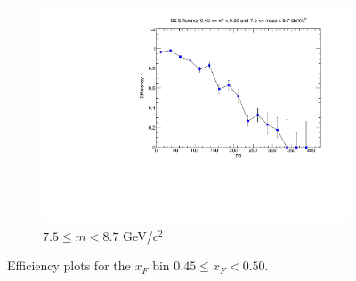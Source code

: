 \documentclass[11pt]{article}
\begin{document}
\begin{figure}[p]
\begin{subfigure}[b]{0.32\textwidth}
        \includegraphics[width=\textwidth]{./kTrackerEfficiencyPlots/D2_Efficiency_xF9_mass10.pdf}
        \caption{$7.5 \leq m < 8.7$ GeV/$c^2$}
    \end{subfigure}
    \caption{Efficiency plots for the $x_F$ bin $0.45 \leq x_F < 0.50$.}
\end{figure}
\end{document}
